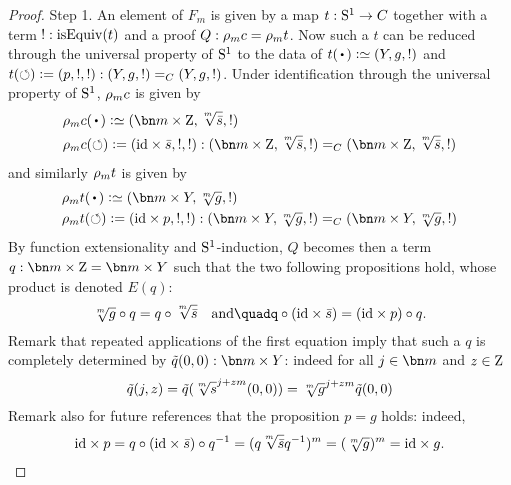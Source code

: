 \begin{proof}
  {\sc Step 1.} An element of $F_m$ is given by a map $t:{\mathrm{S}^1} \to C$
  together with a term $!:\isEq(t)$ and a proof
  $Q: \rho_{m}c = \rho_{m}t$. Now such a $t$ can be reduced through
  the universal property of ${\mathrm{S}^1}$ to the data of
  $t(\base)\defequi (Y,g,!)$ and
  $t(\circlearrowleft)\mathrel{\vcentcolon=} (p,!,!): (Y,g,!) =_C (Y,g,!)$. Under identification
  through the universal property of ${\mathrm{S}^1}$, $\rho_{m}c$ is given by
  \begin{displaymath}
    \begin{split}
      &\cdg{m}c(\base) \defequi (\bn m\times \zet,\sqrt[\uproot{2}m] {\etop s},!)\\
      &\cdg{m}c(\Sloop) \defis (\id \times {\etop s},!,!): (\bn
      m\times \zet,\sqrt[\uproot{2}m] {\etop s},!) =_C (\bn m\times
      \zet,\sqrt[\uproot{2}m] {\etop s},!)
    \end{split}
  \end{displaymath}
  and similarly $\rho_{m}t$ is given by
  \begin{displaymath}
    \begin{split}
      &\cdg{m}t(\base) \defequi (\bn m\times Y,\sqrt[\uproot{2}m] g,!)\\
      &\cdg{m}t(\Sloop) \defis (\id \times p,!,!): (\bn m\times
      Y,\sqrt[\uproot{2}m] g,!) =_C (\bn m\times Y,\sqrt[\uproot{2}m] g,!)
    \end{split}
  \end{displaymath}
  By function extensionality and ${\mathrm{S}^1}$-induction, $Q$ becomes then a
  term $q:\bn m\times \zet = \bn m\times Y$ such that the two
  following propositions hold, whose product is denoted $E(q)$:
  \begin{displaymath}
    {\sqrt[\uproot{2}m]g} \circ q = q \circ \sqrt[\uproot{2}m]{\etop s}%
    \quad\text{and}\quad%
    q \circ (\id \times {\etop s}) = (\id \times p) \circ q.%
  \end{displaymath}
  Remark that repeated applications of the first equation imply that
  such a $q$ is completely determined by
  $\ptoe q (0,0): \bn m\times Y$: indeed for all $j\in\bn m$ and
  $z\in\mathrm{Z}$
  \begin{displaymath}
    \ptoe q (j,z) = \ptoe q ( \sqrt[\uproot{2}m]s^{j+zm} (0,0))%
    = \sqrt[\uproot{2}m]g^{j+zm} \ptoe q(0,0)%
  \end{displaymath}
  Remark also for future references that the proposition $p=g$ holds:
  indeed,
  \begin{displaymath}
    \id \times p = q \circ (\id \times {\etop s}) \circ q^{-1}
    = (q\sqrt[\uproot{2}m]{\etop s}q^{-1})^m = (\sqrt[\uproot{2}m]g)^m = \id \times g.
  \end{displaymath}


\end{proof}
